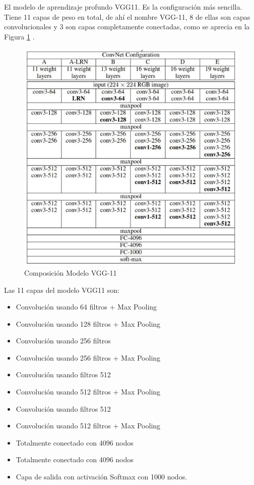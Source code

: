 El modelo de aprendizaje profundo VGG11. Es la configuración más sencilla. Tiene 11 capas de peso en total, de ahí el nombre VGG-11, 8 de ellas son capas convolucionales y 3 son capas completamente conectadas, como se aprecia en la Figura \ref{fig:VGG11} \cite{ref_3}.

\begin{figure}[ht]
	\centering
	\includegraphics[scale=0.6]{Figs/70.png}
	\caption{Composición Modelo VGG-11}
	\label{fig:VGG11}
\end{figure}

Las 11 capas del modelo VGG11 son:
\begin{itemize}
	\item Convolución usando 64 filtros + Max Pooling
	\item Convolución usando 128 filtros + Max Pooling
	\item Convolución usando 256 filtros
	\item Convolución usando 256 filtros + Max Pooling
	\item Convolución usando filtros 512
	\item Convolución usando 512 filtros + Max Pooling
	\item Convolución usando filtros 512
	\item Convolución usando 512 filtros + Max Pooling
	\item Totalmente conectado con 4096 nodos
	\item Totalmente conectado con 4096 nodos
	\item Capa de salida con activación Softmax con 1000 nodos.
\end{itemize}

